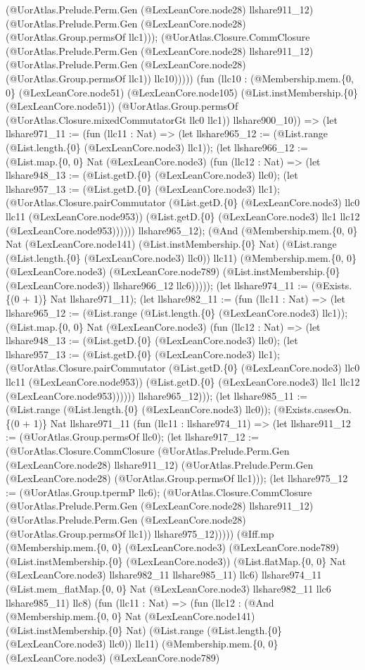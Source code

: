 \documentclass[11pt]{article}
\begin{document}
(@UorAtlas.Prelude.Perm.Gen (@LexLeanCore.node28) llshare911\_12) (@UorAtlas.Prelude.Perm.Gen (@LexLeanCore.node28) (@UorAtlas.Group.permsOf llc1))); (@UorAtlas.Closure.CommClosure (@UorAtlas.Prelude.Perm.Gen (@LexLeanCore.node28) llshare911\_12) (@UorAtlas.Prelude.Perm.Gen (@LexLeanCore.node28) (@UorAtlas.Group.permsOf llc1)) llc10))))) (fun (llc10 : (@Membership.mem.\{0, 0\} (@LexLeanCore.node51) (@LexLeanCore.node105) (@List.instMembership.\{0\} (@LexLeanCore.node51)) (@UorAtlas.Group.permsOf (@UorAtlas.Closure.mixedCommutatorGt llc0 llc1)) llshare900\_10)) => (let llshare971\_11 := (fun (llc11 : Nat) => (let llshare965\_12 := (@List.range (@List.length.\{0\} (@LexLeanCore.node3) llc1)); (let llshare966\_12 := (@List.map.\{0, 0\} Nat (@LexLeanCore.node3) (fun (llc12 : Nat) => (let llshare948\_13 := (@List.getD.\{0\} (@LexLeanCore.node3) llc0); (let llshare957\_13 := (@List.getD.\{0\} (@LexLeanCore.node3) llc1); (@UorAtlas.Closure.pairCommutator (@List.getD.\{0\} (@LexLeanCore.node3) llc0 llc11 (@LexLeanCore.node953)) (@List.getD.\{0\} (@LexLeanCore.node3) llc1 llc12 (@LexLeanCore.node953)))))) llshare965\_12); (@And (@Membership.mem.\{0, 0\} Nat (@LexLeanCore.node141) (@List.instMembership.\{0\} Nat) (@List.range (@List.length.\{0\} (@LexLeanCore.node3) llc0)) llc11) (@Membership.mem.\{0, 0\} (@LexLeanCore.node3) (@LexLeanCore.node789) (@List.instMembership.\{0\} (@LexLeanCore.node3)) llshare966\_12 llc6))))); (let llshare974\_11 := (@Exists.\{(0 + 1)\} Nat llshare971\_11); (let llshare982\_11 := (fun (llc11 : Nat) => (let llshare965\_12 := (@List.range (@List.length.\{0\} (@LexLeanCore.node3) llc1)); (@List.map.\{0, 0\} Nat (@LexLeanCore.node3) (fun (llc12 : Nat) => (let llshare948\_13 := (@List.getD.\{0\} (@LexLeanCore.node3) llc0); (let llshare957\_13 := (@List.getD.\{0\} (@LexLeanCore.node3) llc1); (@UorAtlas.Closure.pairCommutator (@List.getD.\{0\} (@LexLeanCore.node3) llc0 llc11 (@LexLeanCore.node953)) (@List.getD.\{0\} (@LexLeanCore.node3) llc1 llc12 (@LexLeanCore.node953)))))) llshare965\_12))); (let llshare985\_11 := (@List.range (@List.length.\{0\} (@LexLeanCore.node3) llc0)); (@Exists.casesOn.\{(0 + 1)\} Nat llshare971\_11 (fun (llc11 : llshare974\_11) => (let llshare911\_12 := (@UorAtlas.Group.permsOf llc0); (let llshare917\_12 := (@UorAtlas.Closure.CommClosure (@UorAtlas.Prelude.Perm.Gen (@LexLeanCore.node28) llshare911\_12) (@UorAtlas.Prelude.Perm.Gen (@LexLeanCore.node28) (@UorAtlas.Group.permsOf llc1))); (let llshare975\_12 := (@UorAtlas.Group.tpermP llc6); (@UorAtlas.Closure.CommClosure (@UorAtlas.Prelude.Perm.Gen (@LexLeanCore.node28) llshare911\_12) (@UorAtlas.Prelude.Perm.Gen (@LexLeanCore.node28) (@UorAtlas.Group.permsOf llc1)) llshare975\_12))))) (@Iff.mp (@Membership.mem.\{0, 0\} (@LexLeanCore.node3) (@LexLeanCore.node789) (@List.instMembership.\{0\} (@LexLeanCore.node3)) (@List.flatMap.\{0, 0\} Nat (@LexLeanCore.node3) llshare982\_11 llshare985\_11) llc6) llshare974\_11 (@List.mem\_flatMap.\{0, 0\} Nat (@LexLeanCore.node3) llshare982\_11 llc6 llshare985\_11) llc8) (fun (llc11 : Nat) => (fun (llc12 : (@And (@Membership.mem.\{0, 0\} Nat (@LexLeanCore.node141) (@List.instMembership.\{0\} Nat) (@List.range (@List.length.\{0\} (@LexLeanCore.node3) llc0)) llc11) (@Membership.mem.\{0, 0\} (@LexLeanCore.node3) (@LexLeanCore.node789) 
\end{document}
